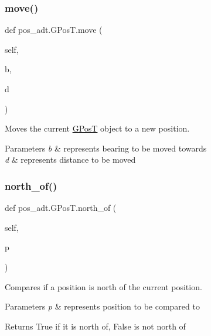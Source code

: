 \subsubsection{\texorpdfstring{move()}{move()}}
{\footnotesize\ttfamily def pos\+\_\+adt.\+G\+Pos\+T.\+move (\begin{DoxyParamCaption}\item[{}]{self,  }\item[{}]{b,  }\item[{}]{d }\end{DoxyParamCaption})}



Moves the current \hyperlink{classpos__adt_1_1_g_pos_t}{G\+PosT} object to a new position. 


\begin{DoxyParams}{Parameters}
{\em b} & represents bearing to be moved towards \\
\hline
{\em d} & represents distance to be moved \\
\hline
\end{DoxyParams}
\mbox{\label{classpos__adt_1_1_g_pos_t_adb5cfeefc3c133895289d3507e7a14f7}} 
\subsubsection{\texorpdfstring{north\+\_\+of()}{north\_of()}}
{\footnotesize\ttfamily def pos\+\_\+adt.\+G\+Pos\+T.\+north\+\_\+of (\begin{DoxyParamCaption}\item[{}]{self,  }\item[{}]{p }\end{DoxyParamCaption})}



Compares if a position is north of the current position. 


\begin{DoxyParams}{Parameters}
{\em p} & represents position to be compared to \\
\hline
\end{DoxyParams}
\begin{DoxyReturn}{Returns}
True if it is north of, False is not north of 
\end{DoxyReturn}
\mbox{\label{classpos__adt_1_1_g_pos_t_a89baaed8a97b6b3eeba5aeea866c888e}} 
